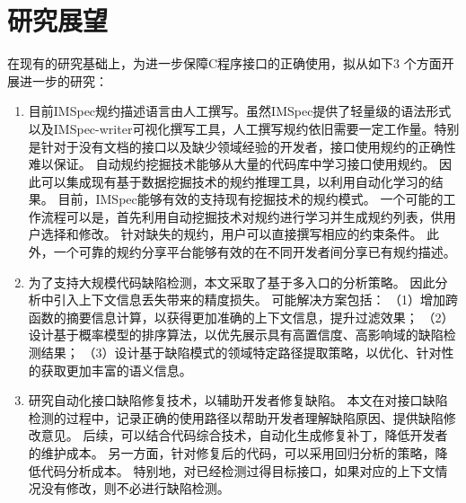 \section{研究展望}
在现有的研究基础上，为进一步保障C程序接口的正确使用，拟从如下3 个方面开展进一步的研究：
\begin{enumerate}
	\item 目前IMSpec规约描述语言由人工撰写。虽然IMSpec提供了轻量级的语法形式以及IMSpec-writer可视化撰写工具，人工撰写规约依旧需要一定工作量。特别是针对于没有文档的接口以及缺少领域经验的开发者，接口使用规约的正确性难以保证。
	自动规约挖掘技术能够从大量的代码库中学习接口使用规约。
	因此可以集成现有基于数据挖掘技术的规约推理工具，以利用自动化学习的结果。
	目前，IMSpec能够有效的支持现有挖掘技术的规约模式。
	一个可能的工作流程可以是，首先利用自动挖掘技术对规约进行学习并生成规约列表，供用户选择和修改。
	针对缺失的规约，用户可以直接撰写相应的约束条件。
	此外，一个可靠的规约分享平台能够有效的在不同开发者间分享已有规约描述。
	
	\item 为了支持大规模代码缺陷检测，本文采取了基于多入口的分析策略。
	因此分析中引入上下文信息丢失带来的精度损失。
	可能解决方案包括：
	（1）增加跨函数的摘要信息计算，以获得更加准确的上下文信息，提升过滤效果；
	（2）设计基于概率模型的排序算法，以优先展示具有高置信度、高影响域的缺陷检测结果；
	（3）设计基于缺陷模式的领域特定路径提取策略，以优化、针对性的获取更加丰富的语义信息。
	
	
	\item 研究自动化接口缺陷修复技术，以辅助开发者修复缺陷。
	本文在对接口缺陷检测的过程中，记录正确的使用路径以帮助开发者理解缺陷原因、提供缺陷修改意见。
	后续，可以结合代码综合技术，自动化生成修复补丁，降低开发者的维护成本。
	另一方面，针对修复后的代码，可以采用回归分析的策略，降低代码分析成本。
	特别地，对已经检测过得目标接口，如果对应的上下文情况没有修改，则不必进行缺陷检测。
\end{enumerate}
